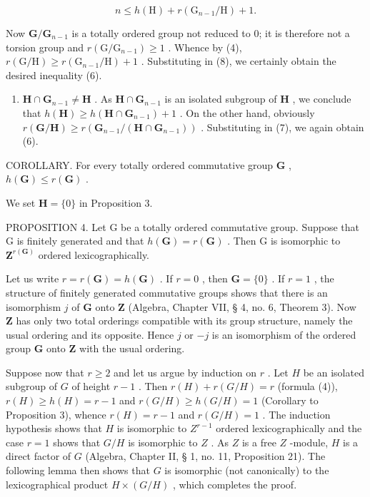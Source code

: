 \[
n \leqslant h (\mathrm{H}) + r (\mathrm{G} _ {n - 1} / \mathrm{H}) + 1.\tag{8}
\]

Now \(\mathbf{G} / \mathbf{G}_{n - 1}\) is a totally ordered group not reduced to 0; it is therefore not a torsion group and \(r(\mathrm{G} / \mathrm{G}_{n - 1}) \geqslant 1\) . Whence by (4), \(r(\mathrm{G} / \mathrm{H}) \geqslant r(\mathrm{G}_{n - 1} / \mathrm{H}) + 1\) . Substituting in (8), we certainly obtain the desired inequality (6).

\begin{enumerate}
\def\labelenumi{(\alph{enumi})}
\setcounter{enumi}{1}
\tightlist
\item
  \(\mathbf{H} \cap \mathbf{G}_{n-1} \neq \mathbf{H}\) . As \(\mathbf{H} \cap \mathbf{G}_{n-1}\) is an isolated subgroup of \(\mathbf{H}\) , we conclude that \(h(\mathbf{H}) \geqslant h(\mathbf{H} \cap \mathbf{G}_{n-1}) + 1\) . On the other hand, obviously \(r(\mathbf{G}/\mathbf{H}) \geqslant r(\mathbf{G}_{n-1}/(\mathbf{H} \cap \mathbf{G}_{n-1}))\) . Substituting in (7), we again obtain (6).
\end{enumerate}

COROLLARY. For every totally ordered commutative group \(\mathbf{G}\) , \(h(\mathbf{G}) \leqslant r(\mathbf{G})\) .

We set \(\mathbf{H} = \{0\}\) in Proposition 3.

PROPOSITION 4. Let G be a totally ordered commutative group. Suppose that G is finitely generated and that \(h(\mathbf{G}) = r(\mathbf{G})\) . Then G is isomorphic to \(\mathbf{Z}^{r(\mathbf{G})}\) ordered lexicographically.

Let us write \(r = r(\mathbf{G}) = h(\mathbf{G})\) . If \(r = 0\) , then \(\mathbf{G} = \{0\}\) . If \(r = 1\) , the structure of finitely generated commutative groups shows that there is an isomorphism \(j\) of \(\mathbf{G}\) onto \(\mathbf{Z}\) (Algebra, Chapter VII, § 4, no. 6, Theorem 3). Now \(\mathbf{Z}\) has only two total orderings compatible with its group structure, namely the usual ordering and its opposite. Hence \(j\) or \(-j\) is an isomorphism of the ordered group \(\mathbf{G}\) onto \(\mathbf{Z}\) with the usual ordering.

Suppose now that \(r \geqslant 2\) and let us argue by induction on \(r\) . Let \(H\) be an isolated subgroup of \(G\) of height \(r - 1\) . Then \(r(H) + r(G/H) = r\) (formula (4)), \(r(H) \geqslant h(H) = r - 1\) and \(r(G/H) \geqslant h(G/H) = 1\) (Corollary to Proposition 3), whence \(r(H) = r - 1\) and \(r(G/H) = 1\) . The induction hypothesis shows that \(H\) is isomorphic to \(Z^{r-1}\) ordered lexicographically and the case \(r = 1\) shows that \(G/H\) is isomorphic to \(Z\) . As \(Z\) is a free \(Z\) -module, \(H\) is a direct factor of \(G\) (Algebra, Chapter II, § 1, no. 11, Proposition 21). The following lemma then shows that \(G\) is isomorphic (not canonically) to the lexicographical product \(H \times (G/H)\) , which completes the proof.


